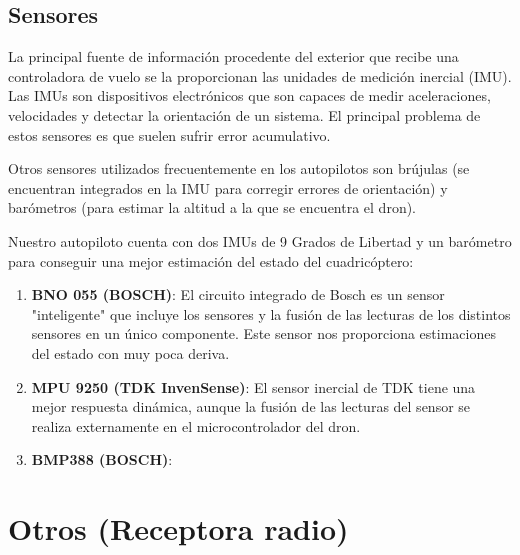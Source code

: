 \subsection{Sensores}
La principal fuente de información procedente del exterior que recibe una controladora de vuelo se la proporcionan las unidades de medición inercial (IMU). Las IMUs son dispositivos electrónicos que son capaces de medir aceleraciones, velocidades y detectar la orientación de un sistema. El principal problema de estos sensores es que suelen sufrir error acumulativo.
\\


\par Otros sensores utilizados frecuentemente en los autopilotos son brújulas (se encuentran integrados en la IMU para corregir errores de orientación) y barómetros (para estimar la altitud a la que se encuentra el dron).\\
\medskip

Nuestro autopiloto cuenta con dos IMUs de 9 Grados de Libertad y un barómetro para conseguir una mejor estimación del estado del cuadricóptero:

\begin{enumerate}
	\item \textbf{BNO 055 (BOSCH)}: El circuito integrado de Bosch es un sensor "inteligente" que incluye los sensores y la fusión de las lecturas de los distintos sensores en un único componente.
	Este sensor nos proporciona estimaciones del estado con muy poca deriva. 
	
	\item \textbf{MPU 9250 (TDK InvenSense)}: El sensor inercial de TDK tiene una mejor respuesta dinámica, aunque la fusión de las lecturas del sensor se realiza externamente en el microcontrolador del dron.
	
	\item \textbf{BMP388 (BOSCH)}:
\end{enumerate}

\section{Otros (Receptora radio)}

